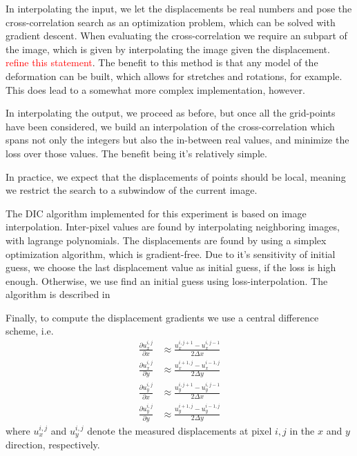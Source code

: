 \documentclass[5p,a4paper]{elsarticle}
\begin{document}
	In interpolating the input, we let the displacements be real numbers and pose the cross-correlation search as an optimization problem, which can be solved with gradient descent. When evaluating the cross-correlation we require an subpart of the image, which is given by interpolating the image given the displacement. \textcolor{red}{refine this statement}. The benefit to this method is that any model of the deformation can be built, which allows for stretches and rotations, for example. This does lead to a somewhat more complex implementation, however. 
	
	In interpolating the output, we proceed as before, but once all the grid-points have been considered, we build an interpolation of the cross-correlation which spans not only the integers but also the in-between real values, and minimize the loss over those values. The benefit being it's relatively simple.
	
	In practice, we expect that the displacements of points should be local, meaning we restrict the search to a subwindow of the current image.
	
	The DIC algorithm implemented for this experiment is based on image interpolation. Inter-pixel values are found by interpolating neighboring images, with lagrange polynomials. The displacements are found by using a simplex optimization algorithm, which is gradient-free. Due to it's sensitivity of initial guess, we choose the last displacement value as initial guess, if the loss is high enough. Otherwise, we use find an initial guess using loss-interpolation. The algorithm is described in
	
	
	Finally, to compute the displacement gradients we use a central difference scheme, i.e.
	\begin{align*}
		\frac{\partial u_x^{i,j}}{\partial x} & \approx \frac{u_x^{i,j+1}-u_x^{i,j-1}}{2 \Delta x} \\
		\frac{\partial u_x^{i,j}}{\partial y} & \approx \frac{u_x^{i+1,j}-u_x^{i-1,j}}{2 \Delta y} \\
		\frac{\partial u_y^{i,j}}{\partial x} & \approx \frac{u_y^{i,j+1}-u_y^{i,j-1}}{2 \Delta x} \\
		\frac{\partial u_y^{i,j}}{\partial y} & \approx \frac{u_y^{i+1,j}-u_y^{i-1,j}}{2 \Delta y} 
	\end{align*}
	where $u_x^{i,j}$ and $u_y^{i,j}$ denote the measured displacements at pixel $i,j$ in the $x$ and $y$ direction, respectively. 
	
\end{document}
